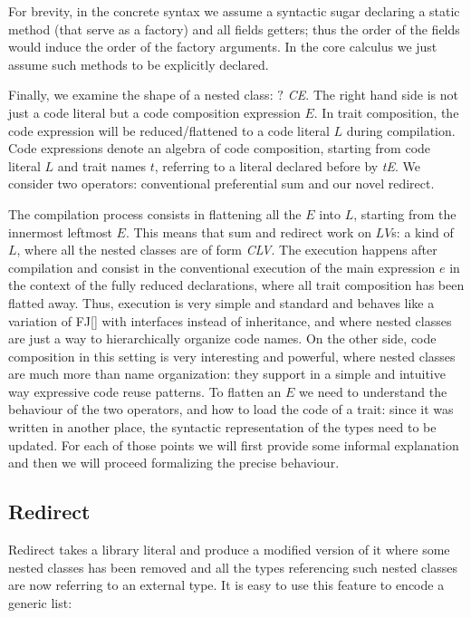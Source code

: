 For brevity, in the concrete syntax we assume a syntactic sugar declaring
a static \Q@of@ method (that serve as a factory) and all fields getters; 
thus the order of the fields would induce the order of the factory arguments.
In the core calculus we just assume such methods to be explicitly declared.

Finally, we examine the shape of a nested class: \textit{$?$ C\eq{}E}.
The right hand side is not just a code literal but a code composition expression $E$.
In trait composition, the code expression will be reduced/flattened to a code literal $L$
during compilation.
Code expressions denote an algebra of code composition, starting from code literal $L$
and trait names $t$, referring to a literal declared before by \textit{t\eq{}E}.
We consider two operators: conventional preferential sum 
 \textit{} and our novel redirect\textit{}.

The compilation process consists in flattening all the $E$ into $L$,
starting from the innermost leftmost $E$. This means that sum and redirect work on $LV$s:
a kind of $L$, where all the nested classes are of form \textit{C\eq{}LV}.
The execution happens after compilation and consist in the conventional execution of the main expression $e$
in the context of the fully reduced declarations, where all trait composition has
been flatted away.
Thus, execution is very simple and standard and behaves like a variation of FJ[] with interfaces
instead of inheritance, and where nested classes are just a way to hierarchically organize code names.
On the other side, code composition in this setting is very interesting and powerful, where
nested classes are much more than name organization: they support in a simple and intuitive way
expressive code reuse patterns.
To flatten an $E$ we need to understand the behaviour of the two operators, and how to 
load the code of a trait: since it was written in another place, the syntactic representation of
the types need to be updated.
For each of those points we will first provide some informal explanation and then we will proceed formalizing
the precise behaviour.

\subsection{Redirect}

Redirect %
takes a library literal and produce a modified version of it where some nested classes has been removed
and all the types referencing such nested classes are now referring to an external type. It is easy to use this feature to encode a generic list:

